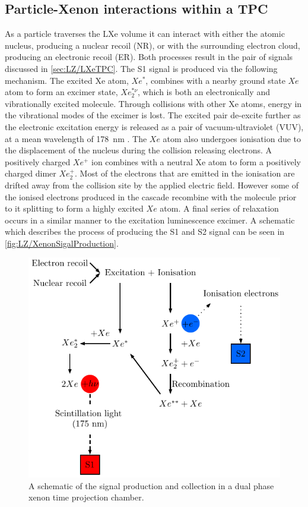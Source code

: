 \subsection{Particle-Xenon interactions within a TPC}\label{sec:LZ/XeInteractionsTPC}
As a particle traverses the LXe volume it can interact with either the atomic nucleus, producing a nuclear recoil (NR), or with the surrounding electron cloud, producing an electronic recoil (ER). Both processes result in the pair of signals discussed in \autoref{sec:LZ/LXeTPC}. The S1 signal is produced via the following mechanism. The excited Xe atom, $Xe^{*}$, combines with a nearby ground state $Xe$ atom to form an excimer state, $Xe_{2}^{*\nu}$, which is both an electronically and vibrationally excited molecule. Through collisions with other Xe atoms, energy in the vibrational modes of the excimer is lost. The excited pair de-excite further as the electronic excitation energy is released as a pair of vacuum-ultraviolet (VUV), at a mean wavelength of 178~nm \cite{Schumann:2014uva}.
The $Xe$ atom also undergoes ionisation due to the displacement of the nucleus during the collision releasing electrons. A positively charged $Xe^{+}$ ion combines with a neutral Xe atom to form a positively charged dimer $Xe^{+}_{2}$. Most of the electrons that are emitted in the ionisation are drifted away from the collision site by the applied electric field. However some of the ionised electrons produced in the cascade recombine with the molecule prior to it splitting to form a highly excited $Xe$ atom. A final series of relaxation occurs in a similar manner to the excitation luminescence excimer. A schematic which describes the process of producing the S1 and S2 signal can be seen in \autoref{fig:LZ/XenonSigalProduction}.
\begin{figure}[!ht]
    \centering
    \includegraphics[width=0.8\linewidth]{figures/LZ/Xenon_interaction.pdf}
    \caption{A schematic of the signal production and collection in a dual phase xenon time projection chamber.}
    \label{fig:LZ/XenonSigalProduction}
\end{figure}

